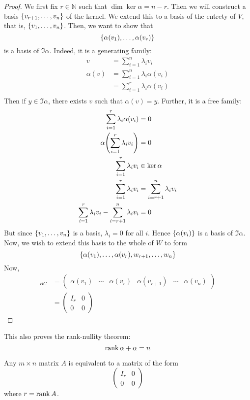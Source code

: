 \begin{proof}
	We first fix \( r \in \mathbb N \) such that \( \dim \ker \alpha = n - r \).
	Then we will construct a basis \( \qty{v_{r+1}, \dots, v_n} \) of the kernel.
	We extend this to a basis of the entrety of \( V \), that is, \( \qty{v_1,\dots,v_n} \).
	Then, we want to show that
	\[
		\qty{\alpha(v_1), \dots, \alpha(v_r)}
	\]
	is a basis of \( \Im \alpha \).
	Indeed, it is a generating family:
	\begin{align*}
		v         & = \sum_{i=1}^n \lambda_i v_i         \\
		\alpha(v) & = \sum_{i=1}^n \lambda_i \alpha(v_i) \\
		          & = \sum_{i=1}^r \lambda_i \alpha(v_i) \\
	\end{align*}
	Then if \( y \in \Im \alpha \), there exists \( v \) such that \( \alpha(v) = y \).
	Further, it is a free family:
	\begin{align*}
		\sum_{i=1}^r \lambda_i \alpha(v_i)                        & = 0                            \\
		\alpha\qty(\sum_{i=1}^r \lambda_i v_i)                    & = 0                            \\
		\sum_{i=1}^r \lambda_i v_i                                & \in \ker \alpha                \\
		\sum_{i=1}^r \lambda_i v_i                                & = \sum_{i=r+1}^n \lambda_i v_i \\
		\sum_{i=1}^r \lambda_i v_i - \sum_{i=r+1}^n \lambda_i v_i & = 0                            \\
	\end{align*}
	But since \( \qty{v_1, \dots, v_n} \) is a basis, \( \lambda_i = 0 \) for all \( i \).
	Hence \( \qty{\alpha(v_i)} \) is a basis of \( \Im \alpha \).
	Now, we wish to extend this basis to the whole of \( W \) to form
	\[
		\qty{\alpha(v_1), \dots, \alpha(v_r), w_{r+1}, \dots, w_n}
	\]
	Now,
	\begin{align*}
		[\alpha]_{BC} & = \begin{pmatrix}
			                  \alpha(v_1) & \cdots & \alpha(v_r) & \alpha(v_{r+1}) & \cdots & \alpha(v_n)
		                  \end{pmatrix} \\
		              & = \begin{pmatrix}
			                  I_r & 0 \\
			                  0   & 0
		                  \end{pmatrix}
	\end{align*}
\end{proof}
\begin{remark}
	This also proves the rank-nullity theorem:
	\[
		\rank \alpha + \null \alpha = n
	\]
\end{remark}
\begin{corollary}
	Any \( m \times n \) matrix \( A \) is equivalent to a matrix of the form
	\[
		\begin{pmatrix}
			I_r & 0 \\
			0   & 0
		\end{pmatrix}
	\]
	where \( r = \rank A \).
\end{corollary}

